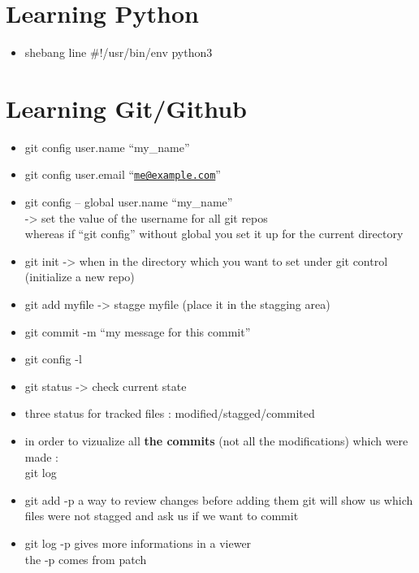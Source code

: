 \documentclass[
]{book}
\providecommand{\tightlist}{%
  \setlength{\itemsep}{0pt}\setlength{\parskip}{0pt}}
\begin{document}
\hypertarget{learning-python}{%
\chapter{Learning Python}\label{learning-python}}

\begin{itemize}
\tightlist
\item
  shebang line
  \#!/usr/bin/env python3
\end{itemize}

\hypertarget{learning-gitgithub}{%
\chapter{Learning Git/Github}\label{learning-gitgithub}}

\begin{itemize}
\item
  git config user.name ``my\_name''
\item
  git config user.email ``\href{mailto:me@example.com}{\nolinkurl{me@example.com}}''
\item
  git config -- global user.name ``my\_name''\\
  -\textgreater{} set the value of the username for all git repos\\
  whereas if ``git config'' without global you set it up for the current directory
\item
  git init -\textgreater{} when in the directory which you want to set under git control (initialize a new repo)
\item
  git add myfile -\textgreater{} stagge myfile (place it in the stagging area)
\item
  git commit -m ``my message for this commit''
\item
  git config -l
\item
  git status -\textgreater{} check current state
\item
  three status for tracked files : modified/stagged/commited
\item
  in order to vizualize all \textbf{the commits} (not all the modifications) which were made :\\
  git log
\item
  git add -p
  a way to review changes before adding them
  git will show us which files were not stagged and ask us if we want to commit
\item
  git log -p gives more informations in a viewer\\
  the -p comes from patch

\end{itemize}
\end{document}
